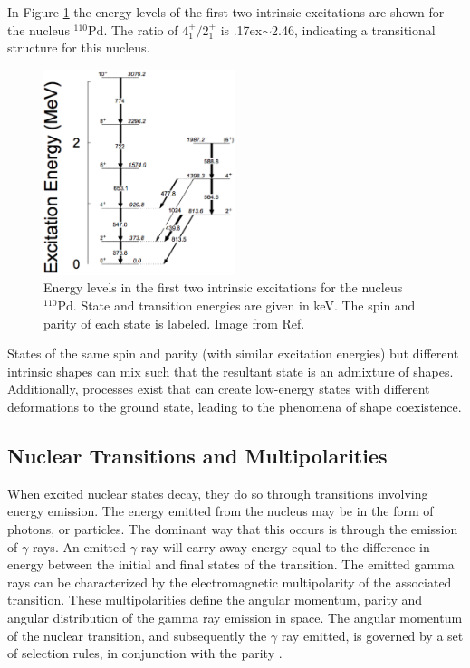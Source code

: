 \documentclass[twocolumn,preprintnumbers,amsmath,amssymb]{revtex4}
\begin{document}
In Figure \ref{levels} the energy levels of the first two intrinsic excitations are shown for the nucleus $^{110}\mathrm{Pd}$. The ratio of $4^+_1/2^+_1$ is {\raise.17ex\hbox{$\scriptstyle\sim$}}2.46, indicating a transitional structure for this nucleus. 
\begin{figure}[!ht]
  \centering
  \includegraphics[width=0.5\textwidth,height=0.36\textwidth,keepaspectratio]{Levels.PNG}
  \caption{Energy levels in the first two intrinsic excitations for the nucleus $^{110}\mathrm{Pd}$. State and transition energies are given in keV. The spin and parity of each state is labeled. Image from Ref\cite{NNDC}.}
  \label{levels}
\end{figure} 
States of the same spin and parity (with similar excitation energies) but different intrinsic shapes can mix such that the resultant state is an admixture of shapes. Additionally, processes exist that can create low-energy states with different deformations to the ground state, leading to the phenomena of shape coexistence.

\subsection{Nuclear Transitions and Multipolarities}

When excited nuclear states decay, they do so through transitions involving energy emission. The energy emitted from the nucleus may be in the form of photons, or particles. The dominant way that this occurs is through the emission of $\gamma$ rays. An emitted $\gamma$ ray will carry away energy equal to the difference in energy between the initial and final states of the transition. The emitted gamma rays can be characterized by the electromagnetic multipolarity of the associated transition. These multipolarities define the angular momentum, parity and angular distribution of the gamma ray emission in space. The angular momentum of the nuclear transition, and subsequently the $\gamma$ ray emitted, is governed by a set of selection rules, in conjunction with the parity \cite{EVITTS}.
\end{document}
